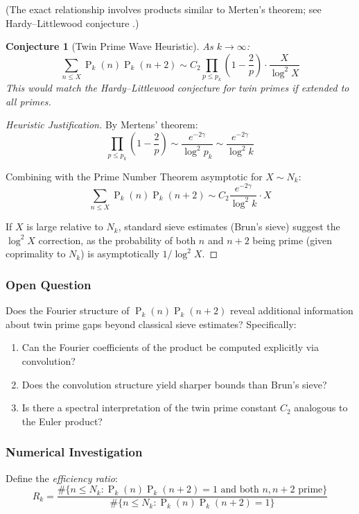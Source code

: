 ﻿\documentclass[12pt,a4paper]{report}
\theoremstyle{plain}
\newtheorem{conjecture}[theorem]{Conjecture}
\theoremstyle{definition}
\DeclareMathOperator{\Pk}{P}
\begin{document}
(The exact relationship involves products similar to Merten's theorem; see Hardy--Littlewood conjecture \cite{Hardy2008}.)

\begin{conjecture}[Twin Prime Wave Heuristic]
\label{conj:twin_prime_wave}
As $k \to \infty$:
\[
\sum_{n \leq X} \Pk_k(n)\Pk_k(n+2) \sim C_2 \prod_{p \leq p_k} \left(1-\frac{2}{p}\right) \cdot \frac{X}{\log^2 X}
\]
This would match the Hardy--Littlewood conjecture for twin primes if extended to all primes.
\end{conjecture}

\begin{proof}[Heuristic Justification]
By Mertens' theorem:
\[
\prod_{p \leq p_k} \left(1-\frac{2}{p}\right) \sim \frac{e^{-2\gamma}}{\log^2 p_k} \sim \frac{e^{-2\gamma}}{\log^2 k}
\]

Combining with the Prime Number Theorem asymptotic for $X \sim N_k$:
\[
\sum_{n \leq X} \Pk_k(n)\Pk_k(n+2) \sim C_2 \frac{e^{-2\gamma}}{\log^2 k} \cdot X
\]

If $X$ is large relative to $N_k$, standard sieve estimates (Brun's sieve) suggest the $\log^2 X$ correction, as the probability of both $n$ and $n+2$ being prime (given coprimality to $N_k$) is asymptotically $1/\log^2 X$.
\end{proof}

\subsubsection*{Open Question}

Does the Fourier structure of $\Pk_k(n)\Pk_k(n+2)$ reveal additional information about twin prime gaps beyond classical sieve estimates? Specifically:
\begin{enumerate}
    \item Can the Fourier coefficients of the product be computed explicitly via convolution?
    \item Does the convolution structure yield sharper bounds than Brun's sieve?
    \item Is there a spectral interpretation of the twin prime constant $C_2$ analogous to the Euler product?
\end{enumerate}

\subsubsection*{Numerical Investigation}

Define the \emph{efficiency ratio}:
\[
R_k = \frac{\#\{n \leq N_k : \Pk_k(n)\Pk_k(n+2)=1 \text{ and both } n, n+2 \text{ prime}\}}{\#\{n \leq N_k : \Pk_k(n)\Pk_k(n+2)=1\}}
\]
\end{document}
